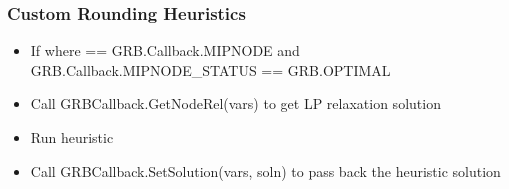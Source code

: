 \documentclass[12pt,handout]{beamer}
\begin{document}
\begin{frame}
\frametitle{Custom Rounding Heuristics}
\begin{itemize}
\item If where == GRB.Callback.MIPNODE and GRB.Callback.MIPNODE\_STATUS == GRB.OPTIMAL
\item Call GRBCallback.GetNodeRel(vars) to get LP relaxation solution
\item Run heuristic
\item Call GRBCallback.SetSolution(vars, soln) to pass back the heuristic solution
\end{itemize}
\end{frame}
\end{document}

